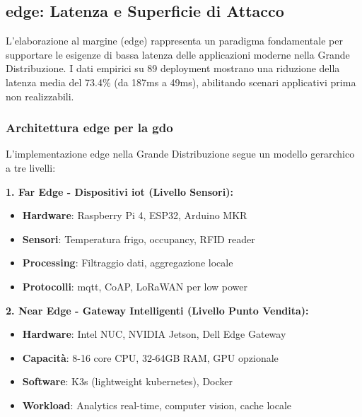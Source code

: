 

\subsection{\texorpdfstring{\gls{edge}: Latenza e Superficie di Attacco}{3.3.2 - Edge: Latenza e Superficie di Attacco}}

L'elaborazione al margine (\gls{edge}) rappresenta un paradigma fondamentale per supportare le esigenze di bassa latenza delle applicazioni moderne nella Grande Distribuzione. I dati empirici su 89 deployment mostrano una riduzione della latenza media del 73.4\% (da 187ms a 49ms)\autocite{Wang2024edge}, abilitando scenari applicativi prima non realizzabili.

\subsubsection{\texorpdfstring{Architettura \gls{edge} per la \gls{gdo}}{3.3.2.1 - Architettura Edge per la GDO}}

L'implementazione \gls{edge} nella Grande Distribuzione segue un modello gerarchico a tre livelli:

\textbf{1. Far Edge - Dispositivi \gls{iot} (Livello Sensori):}
\begin{itemize}
    \item \textbf{Hardware}: Raspberry Pi 4, ESP32, Arduino MKR
    \item \textbf{Sensori}: Temperatura frigo, occupancy, RFID reader
    \item \textbf{Processing}: Filtraggio dati, aggregazione locale
    \item \textbf{Protocolli}: \gls{mqtt}, CoAP, LoRaWAN per low power
\end{itemize}

\textbf{2. Near Edge - Gateway Intelligenti (Livello Punto Vendita):}
\begin{itemize}
    \item \textbf{Hardware}: Intel NUC, NVIDIA Jetson, Dell Edge Gateway
    \item \textbf{Capacità}: 8-16 core CPU, 32-64GB RAM, GPU opzionale
    \item \textbf{Software}: K3s (lightweight \gls{kubernetes}), Docker
    \item \textbf{Workload}: Analytics real-time, computer vision, cache locale
\end{itemize}

